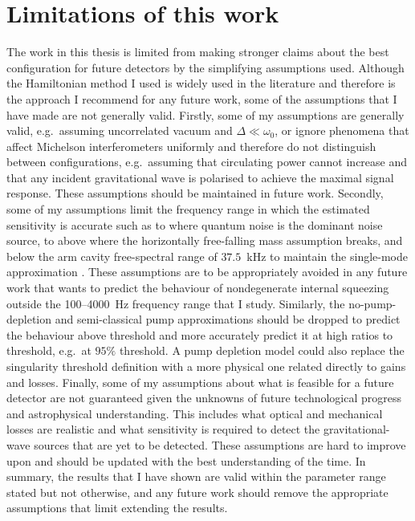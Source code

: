 \section{Limitations of this work}

The work in this thesis is limited from making stronger claims about the best configuration for future detectors by the simplifying assumptions used. Although the Hamiltonian method I used is widely used in the literature and therefore is the approach I recommend for any future work, some of the assumptions that I have made are not generally valid.
Firstly, some of my assumptions are generally valid, e.g.\ assuming uncorrelated vacuum and $\Delta\ll\omega_0$, or ignore phenomena that affect Michelson interferometers uniformly and therefore do not distinguish between configurations, e.g.\ assuming that circulating power cannot increase and that any incident gravitational wave is polarised to achieve the maximal signal response. These assumptions should be maintained in future work.
Secondly, some of my assumptions limit the frequency range in which the estimated sensitivity is accurate such as to where quantum noise is the dominant noise source, to above where  the horizontally free-falling mass assumption breaks, and below the arm cavity free-spectral range of $37.5$~kHz to maintain the single-mode approximation . These assumptions are to be appropriately avoided in any future work that wants to predict the behaviour of nondegenerate internal squeezing outside the 100--4000~Hz frequency range that I study. Similarly, the no-pump-depletion and semi-classical pump approximations should be dropped to predict the behaviour above threshold and more accurately predict it at high ratios to threshold, e.g.\ at $95\%$ threshold. A pump depletion model could also replace the singularity threshold definition with a more physical one related directly to gains and losses. 
Finally, some of my assumptions about what is feasible for a future detector are not guaranteed given the unknowns of future technological progress and astrophysical understanding. This includes what optical and mechanical losses are realistic and what sensitivity is required to detect the gravitational-wave sources that are yet to be detected. These assumptions are hard to improve upon and should be updated with the best understanding of the time.
In summary, the results that I have shown are valid within the parameter range stated but not otherwise, and any future work should remove the appropriate assumptions that limit extending the results.

